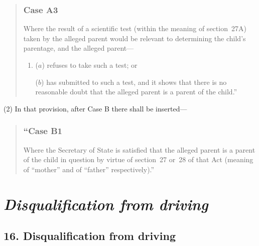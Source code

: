 \documentclass[12pt,a4paper]{article}
\begin{document}
\begin{quotation}
\subsubsection*{Case A3}

Where the result of a scientific test (within the meaning of section~27A) taken by the alleged parent would be relevant to determining the child’s parentage, and the alleged parent—
\begin{enumerate}\item[]
($a$) refuses to take such a test; or

($b$) has submitted to such a test, and it shows that there is no reasonable doubt that the alleged parent is a parent of the child.”
\end{enumerate}
\end{quotation}

(2) In that provision, after Case B there shall be inserted—
\begin{quotation}
\subsubsection*{“Case B1}

Where the Secretary of State is satisfied that the alleged parent is a parent of the child in question by virtue of section~27 or~28 of that Act (meaning of “mother” and of “father” respectively).”
\end{quotation}

\section{\itshape Disqualification from driving}

\subsection{16. Disqualification from driving}
\end{document}
